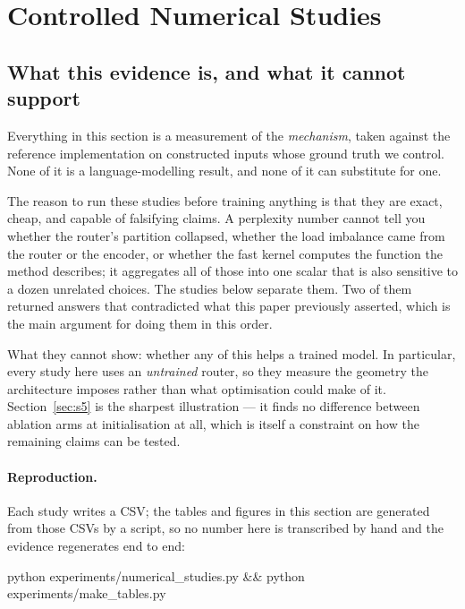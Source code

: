 \section{Controlled Numerical Studies}
\label{sec:studies}

\subsection{What this evidence is, and what it cannot support}
\label{sec:studies-scope}

Everything in this section is a measurement of the \emph{mechanism}, taken against the reference implementation on constructed inputs whose ground truth we control. None of it is a language-modelling result, and none of it can substitute for one.

The reason to run these studies before training anything is that they are exact, cheap, and capable of falsifying claims. A perplexity number cannot tell you whether the router's partition collapsed, whether the load imbalance came from the router or the encoder, or whether the fast kernel computes the function the method describes; it aggregates all of those into one scalar that is also sensitive to a dozen unrelated choices. The studies below separate them. Two of them returned answers that contradicted what this paper previously asserted, which is the main argument for doing them in this order.

What they cannot show: whether any of this helps a trained model. In particular, every study here uses an \emph{untrained} router, so they measure the geometry the architecture imposes rather than what optimisation could make of it. Section~\ref{sec:s5} is the sharpest illustration --- it finds no difference between ablation arms at initialisation at all, which is itself a constraint on how the remaining claims can be tested.

\paragraph{Reproduction.} Each study writes a CSV; the tables and figures in this section are generated from those CSVs by a script, so no number here is transcribed by hand and the evidence regenerates end to end:

\begin{center}
\small\ttfamily
python experiments/numerical\_studies.py \&\& python experiments/make\_tables.py
\end{center}


